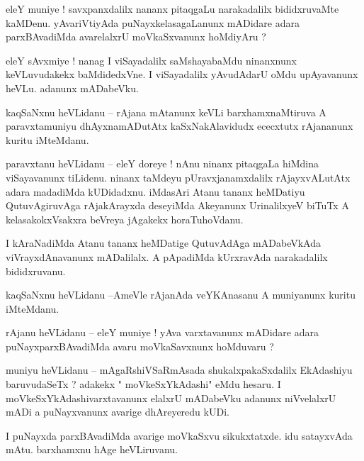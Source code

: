 \documentclass{article}
\begin{document}
\begin{mn}%
eleY muniye ! savxpanxdalilx nananx pitaqgaLu narakadalilx bididxruvaMte kaMDenu. yAvariVtiyAda 
puNayxkelasagaLanunx mADidare adara parxBAvadiMda avarelalxrU moVkaSxvanunx hoMdiyAru ?
\end{mn}

\begin{mn}%
eleY sAvxmiye ! nanag I viSayadalilx saMshayabaMdu ninanxnunx keVLuvudakekx baMdidedxVne. I 
viSayadalilx yAvudAdarU oMdu upAyavanunx heVLu. adanunx mADabeVku.
\end{mn}

\begin{mn}%
kaqSaNxnu heVLidanu -- rAjana mAtanunx keVLi barxhamxnaMtiruva A paravxtamuniyu dhAyxnamADutAtx 
kaSxNakAlavidudx ececxtutx rAjananunx kuritu iMteMdanu.
\end{mn}

\begin{mn}%
paravxtanu heVLidanu -- eleY doreye ! nAnu ninanx pitaqgaLa hiMdina viSayavanunx tiLidenu. ninanx 
taMdeyu pUravxjanamxdalilx rAjayxvALutAtx adara madadiMda kUDidadxnu. iMdasAri Atanu tananx 
heMDatiyu QutuvAgiruvAga rAjakArayxda deseyiMda Akeyanunx UrinalilxyeV biTuTx A kelasakokxVsakxra 
beVreya jAgakekx horaTuhoVdanu.
\end{mn}

\begin{mn}%
I kAraNadiMda Atanu tananx heMDatige QutuvAdAga mADabeVkAda viVrayxdAnavanunx mADalilalx. A 
pApadiMda kUrxravAda narakadalilx bididxruvanu.
\end{mn}

\begin{mn}%
kaqSaNxnu heVLidanu --AmeVle rAjanAda veYKAnasanu A muniyanunx kuritu iMteMdanu.
\end{mn}

\begin{mn}%
rAjanu heVLidanu -- eleY muniye ! yAva varxtavanunx mADidare adara puNayxparxBAvadiMda avaru 
moVkaSavxnunx hoMduvaru ?
\end{mn}

\begin{mn}%
muniyu heVLidanu -- mAgaRshiVSaRmAsada shukalxpakaSxdalilx EkAdashiyu baruvudaSeTx ? adakekx " 
moVkeSxYkAdashi" eMdu hesaru. I moVkeSxYkAdashivarxtavanunx elalxrU mADabeVku adanunx niVvelalxrU 
mADi a puNayxvanunx avarige dhAreyeredu kUDi.
\end{mn}

\begin{mn}%
I puNayxda parxBAvadiMda avarige moVkaSxvu sikukxtatxde. idu satayxvAda mAtu. barxhamxnu hAge 
heVLiruvanu.
\end{mn}
\end{document}
